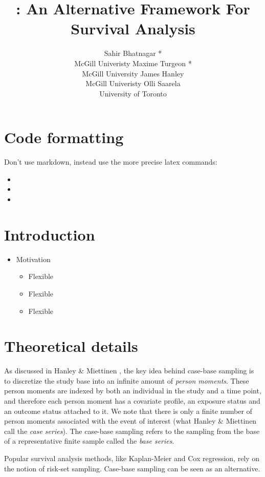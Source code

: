 \documentclass[article]{jss}
\author{
Sahir Bhatnagar *\\McGill Univeristy \And Maxime Turgeon *\\McGill University \And James Hanley\\McGill Univeristy \And Olli Saarela\\University of Toronto
}
\title{\pkg{casebase}: An Alternative Framework For Survival Analysis}
\providecommand{\tightlist}{%
  \setlength{\itemsep}{0pt}\setlength{\parskip}{0pt}}
\begin{document}
\section{Code formatting}\label{code-formatting}

Don't use markdown, instead use the more precise latex commands:

\begin{itemize}
\tightlist
\item
\item
\item
\end{itemize}

\section{Introduction}\label{introduction}

\begin{itemize}
\tightlist
\item
  Motivation

  \begin{itemize}
  \tightlist
  \item
    Flexible
  \item
    Flexible
  \item
    Flexible
  \end{itemize}
\end{itemize}

\section{Theoretical details}\label{theoretical-details}

As discussed in Hanley \& Miettinen \citeyearpar{hanley2009fitting}, the
key idea behind case-base sampling is to discretize the study base into
an infinite amount of \emph{person moments}. These person moments are
indexed by both an individual in the study and a time point, and
therefore each person moment has a covariate profile, an exposure status
and an outcome status attached to it. We note that there is only a
finite number of person moments associated with the event of interest
(what Hanley \& Miettinen call the \emph{case series}). The case-base
sampling refers to the sampling from the base of a representative finite
sample called the \emph{base series}.

Popular survival analysis methods, like Kaplan-Meier and Cox regression,
rely on the notion of risk-set sampling. Case-base sampling can be seen
as an alternative.
\end{document}
